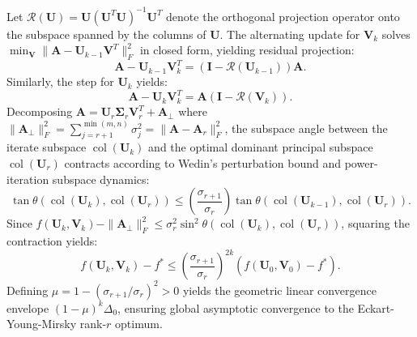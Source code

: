 \documentclass[journal]{IEEEtran}
\begin{document}
\begin{IEEEproof}
Let $\mathcal{R}(\mathbf{U}) = \mathbf{U}(\mathbf{U}^T \mathbf{U})^{-1}\mathbf{U}^T$ denote the orthogonal projection operator onto the subspace spanned by the columns of $\mathbf{U}$. The alternating update for $\mathbf{V}_k$ solves $\min_{\mathbf{V}} \|\mathbf{A} - \mathbf{U}_{k-1} \mathbf{V}^T\|_F^2$ in closed form, yielding residual projection:
\begin{equation}
\mathbf{A} - \mathbf{U}_{k-1} \mathbf{V}_k^T = (\mathbf{I} - \mathcal{R}(\mathbf{U}_{k-1})) \mathbf{A}.
\end{equation}
Similarly, the step for $\mathbf{U}_k$ yields:
\begin{equation}
\mathbf{A} - \mathbf{U}_k \mathbf{V}_k^T = \mathbf{A} (\mathbf{I} - \mathcal{R}(\mathbf{V}_k)).
\end{equation}
Decomposing $\mathbf{A} = \mathbf{U}_r \boldsymbol{\Sigma}_r \mathbf{V}_r^T + \mathbf{A}_\perp$ where $\|\mathbf{A}_\perp\|_F^2 = \sum_{j=r+1}^{\min(m, n)} \sigma_j^2 = \|\mathbf{A} - \mathbf{A}_r\|_F^2$, the subspace angle between the iterate subspace $\operatorname{col}(\mathbf{U}_k)$ and the optimal dominant principal subspace $\operatorname{col}(\mathbf{U}_r)$ contracts according to Wedin's perturbation bound and power-iteration subspace dynamics:
\begin{equation}
\tan \theta(\operatorname{col}(\mathbf{U}_k), \operatorname{col}(\mathbf{U}_r)) \le \left( \frac{\sigma_{r+1}}{\sigma_r} \right) \tan \theta(\operatorname{col}(\mathbf{U}_{k-1}), \operatorname{col}(\mathbf{U}_r)).
\end{equation}
Since $f(\mathbf{U}_k, \mathbf{V}_k) - \|\mathbf{A}_\perp\|_F^2 \le \sigma_r^2 \sin^2 \theta(\operatorname{col}(\mathbf{U}_k), \operatorname{col}(\mathbf{U}_r))$, squaring the contraction yields:
\begin{equation}
f(\mathbf{U}_k, \mathbf{V}_k) - f^* \le \left( \frac{\sigma_{r+1}}{\sigma_r} \right)^{2k} (f(\mathbf{U}_0, \mathbf{V}_0) - f^*).
\end{equation}
Defining $\mu = 1 - (\sigma_{r+1} / \sigma_r)^2 > 0$ yields the geometric linear convergence envelope $(1 - \mu)^k \Delta_0$, ensuring global asymptotic convergence to the Eckart-Young-Mirsky rank-$r$ optimum.
\end{IEEEproof}
\end{document}

